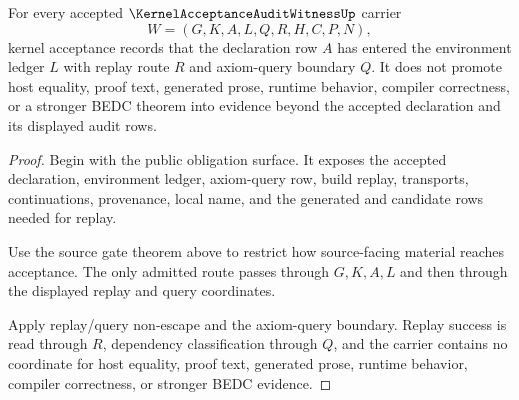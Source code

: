 \begin{theorem}
\label{thm:kernel-acceptance-audit-witness-acceptance-boundary}
For every accepted $\KernelAcceptanceAuditWitnessUp$ carrier
$$
W=(G,K,A,L,Q,R,H,C,P,N),
$$
kernel acceptance records that the declaration row $A$ has entered the environment ledger $L$ with replay route $R$ and axiom-query boundary $Q$. It does not promote host equality, proof text, generated prose, runtime behavior, compiler correctness, or a stronger BEDC theorem into evidence beyond the accepted declaration and its displayed audit rows.
\end{theorem}
\begin{proof}
Begin with the public obligation surface. It exposes the accepted declaration, environment ledger, axiom-query row, build replay, transports, continuations, provenance, local name, and the generated and candidate rows needed for replay.

Use the source gate theorem above to restrict how source-facing material reaches acceptance. The only admitted route passes through $G,K,A,L$ and then through the displayed replay and query coordinates.

Apply replay/query non-escape and the axiom-query boundary. Replay success is read through $R$, dependency classification through $Q$, and the carrier contains no coordinate for host equality, proof text, generated prose, runtime behavior, compiler correctness, or stronger BEDC evidence.
\end{proof}

